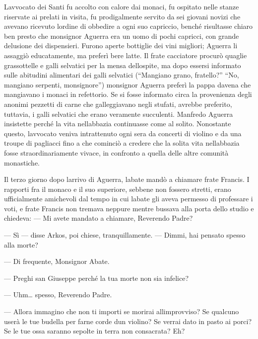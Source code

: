 L\textquotesingle avvocato dei Santi fu accolto con calore dai monaci,
fu ospitato nelle stanze riservate ai prelati in visita, fu
prodigalmente servito da sei giovani novizi che avevano ricevuto
l\textquotesingle ordine di obbedire a ogni suo capriccio, benché
risultasse chiaro ben presto che monsignor Aguerra era un uomo di pochi
capricci, con grande delusione dei dispensieri. Furono aperte bottiglie
dei vini migliori; Aguerra li assaggiò educatamente, ma preferì bere
latte. Il frate cacciatore procurò quaglie grassottelle e galli
selvatici per la mensa dell\textquotesingle ospite, ma dopo essersi
informato sulle abitudini alimentari dei galli selvatici (``Mangiano
grano, fratello?'' ``No, mangiano serpenti, monsignore'') monsignor
Aguerra preferì la pappa d\textquotesingle avena che mangiavano i monaci
in refettorio. Se si fosse informato circa la provenienza degli anonimi
pezzetti di carne che galleggiavano negli stufati, avrebbe preferito,
tuttavia, i galli selvatici che erano veramente succulenti. Manfredo
Aguerra insistette perché la vita nell\textquotesingle abbazia
continuasse come al solito. Nonostante questo,
l\textquotesingle avvocato veniva intrattenuto ogni sera da concerti di
violino e da una troupe di pagliacci fino a che cominciò a credere che
la solita vita nell\textquotesingle abbazia fosse straordinariamente
vivace, in confronto a quella delle altre comunità monastiche.

Il terzo giorno dopo l\textquotesingle arrivo di Aguerra,
l\textquotesingle abate mandò a chiamare frate Francis. I rapporti fra
il monaco e il suo superiore, sebbene non fossero stretti, erano
ufficialmente amichevoli dal tempo in cui l\textquotesingle abate gli
aveva permesso di professare i voti, e frate Francis non tremava neppure
mentre bussava alla porta dello studio e chiedeva: --- Mi avete mandato
a chiamare, Reverendo Padre?

--- Sì --- disse Arkos, poi chiese, tranquillamente. --- Dimmi, hai
pensato spesso alla morte?

--- Di frequente, Monsignor Abate.

--- Preghi san Giuseppe perché la tua morte non sia infelice?

--- Uhm\ldots{} spesso, Reverendo Padre.

--- Allora immagino che non ti importi se morirai
all\textquotesingle improvviso? Se qualcuno userà le tue budella per
farne corde d\textquotesingle un violino? Se verrai dato in pasto ai
porci? Se le tue ossa saranno sepolte in terra non consacrata? Eh?

